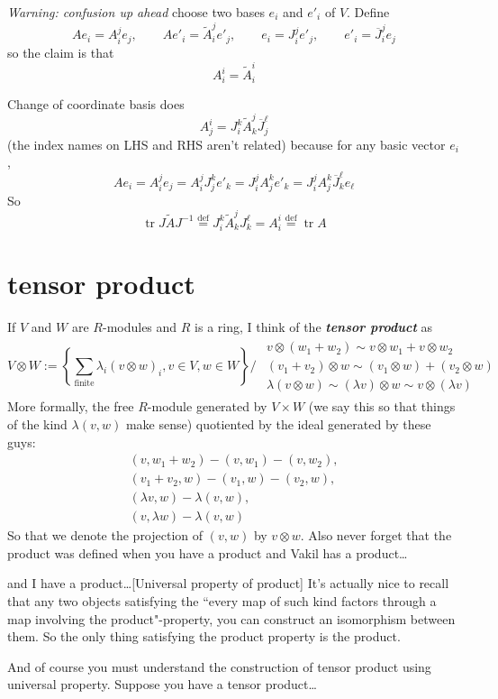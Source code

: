 \textit{Warning: confusion up ahead} choose two bases \(e_i\) and \(e'_i\) of \(V\). Define
\[Ae_i=A^j_ie_j,\qquad Ae'_i=\tilde{A}^j_ie'_j,\qquad e_i=J^j_ie'_j, \qquad e'_i=\overline{J}^j_ie_j\]
so the claim is that
\[A^i_i=\tilde{A}^i_i\]

Change of coordinate basis does
\[A^i_j=J^k_i \tilde{A}^j_k \overline{J}^\ell_j\]
(the index names on LHS and RHS aren't related) because for any basic vector \(e_i\),
\[Ae_i=A^j_i e_j=A^j_i J^k_j e'_k=J_i^jA_j^ke'_k=J_i^jA_j^k \overline{J}_k^\ell e_\ell\]
So
\[\operatorname{tr}J\tilde{A}J^{-1}\overset{\operatorname{def}}{=}J^k_i\tilde{A}^j_k J^\ell_k=A^i_i \overset{\operatorname{def}}{=}\operatorname{tr}A\]


\section{tensor product}

\begin{defn}\leavevmode
If \(V\) and \(W\) are \(R\)-modules and \(R\) is a ring, I think of the \textit{\textbf{tensor product}} as
\[V\otimes W:=\left\{\sum_{\text{finite} }\lambda_i (v \otimes w)_i, v \in V, w \in W \right\} \Big/ \substack{\begin{array}{c}v \otimes (w_1+w_2)\sim v\otimes w_1+ v\otimes w_2\\ (v_1+v_2) \otimes w \sim(v_1 \otimes w)+(v_2 \otimes w)\\ \lambda(v \otimes w)\sim(\lambda v) \otimes w \sim  v \otimes(\lambda v)\end{array}}\]
More formally, the free \(R\)-module generated by \(V \times W\) (we say this so that things of the kind \(\lambda(v,w)\) make sense) quotiented by the ideal generated by these guys:
\begin{gather*}(v,w_1+w_2)-(v,w_1)-(v,w_2),\\ (v_1+v_2,w)-(v_1,w)-(v_2,w),\\ (\lambda v,w)-\lambda(v,w),\\(v,\lambda w)-\lambda(v,w)\end{gather*}
So that we denote the projection of \((v,w)\) by \(v \otimes w\). Also never forget that the product was defined when you have a product and Vakil has a product…
\begin{thing7}{and I have a product…}[Universal property of product]\leavevmode
It's actually nice to recall that any two objects satisfying the ``every map of such kind factors through a map involving the product"-property, you can construct an isomorphism between them. So the only thing satisfying the product property is the product.
\end{thing7}
\end{defn}
And of course you must understand the construction of tensor product using universal property. Suppose you have a tensor product…

